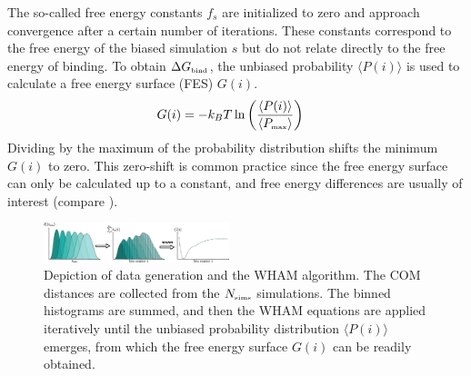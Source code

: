 \documentclass[9pt,tutorial]{livecoms}
\begin{document}
The so-called free energy constants $f_s$ are initialized to zero and approach convergence after a certain number of iterations.\cite{Kumar_1992} These constants correspond to the free energy of the biased simulation $s$ but do not relate directly to the free energy of binding. To obtain $\Delta G_\text{\tiny bind}$, the unbiased probability $\langle P(i) \rangle$ is used to calculate a free energy surface (FES) $G(i)$.\cite{Hub_2010}
\begin{align}
    G(i) & = -k_B T \ln \left(\frac{\langle P(i)\rangle }{ \langle P_\text{\tiny max} \rangle} \right) 
\end{align}
Dividing by the maximum of the probability distribution shifts the minimum $G(i)$ to zero. This zero-shift is common practice since the free energy surface can only be calculated up to a constant, and free energy differences are usually of interest (compare ).
\begin{figure}
    \centering
    \includegraphics[width=0.48\textwidth]{figures/whamAlgorithm.png}
    \caption{Depiction of data generation and the WHAM algorithm. The COM distances are collected from the $N_\text{\tiny sims}$ simulations. The binned histograms are summed, and then the WHAM equations are applied iteratively until the unbiased probability distribution $\langle P(i) \rangle$ emerges, from which the free energy surface $G(i)$ can be readily obtained.}
    \label{fig:whamAlgorithm}
\end{figure}
\end{document}
